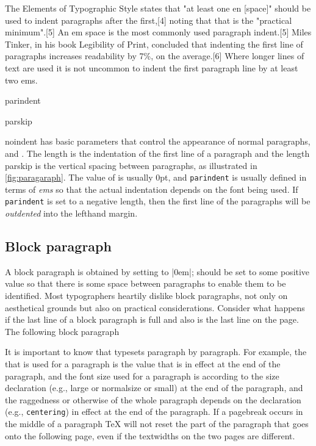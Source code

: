 The Elements of Typographic Style states that "at least one en [space]" should be used to indent paragraphs after the first,[4] noting that that is the "practical minimum".[5] An em space is the most commonly used paragraph indent.[5] Miles Tinker, in his book Legibility of Print, concluded that indenting the first line of paragraphs increases readability by 7\%, on the average.[6] Where longer lines of text are used it is not uncommon to indent the first paragraph line by at least two ems.

\begin{docCommand}{parindent} {  }
\begin{docCommand}{parskip} {}
\begin{docCommand}{noindent}{}
\LaTeXe has basic parameters that control the appearance of normal paragraphs,
 and  .
The length   is the indentation of the first line of a paragraph and the length
parskip is the vertical spacing between paragraphs, as illustrated in \ref{fig:paragaraph}. The
value of  is usually 0pt, and \texttt{parindent} is usually defined in terms of \textit{ems}
so that the actual indentation depends on the font being used. If \texttt{parindent} is set to a
negative length, then the first line of the paragraphs will be \textit{outdented} into the lefthand
margin.
\end{docCommand}
\end{docCommand}
\end{docCommand}



\subsection{Block paragraph}

A block paragraph is obtained by setting  to |0em|;  should be set to
some positive value so that there is some space between paragraphs to enable them to be
identified. Most typographers heartily dislike block paragraphs, not only on aesthetical
grounds but also on practical considerations. Consider what happens if the last line of a
block paragraph is full and also is the last line on the page. The following block paragraph

It is important to know that \latex typesets paragraph by paragraph. For example, the
 that is used for a paragraph is the value that is in effect at the end of the
paragraph, and the font size used for a paragraph is according to the size declaration (e.g.,
large or normalsize or small) at the end of the paragraph, and the raggedness or
otherwise of the whole paragraph depends on the declaration (e.g., \texttt{centering}) in effect
at the end of the paragraph. If a pagebreak occurs in the middle of a paragraph TeX will
not reset the part of the paragraph that goes onto the following page, even if the textwidths
on the two pages are different.


